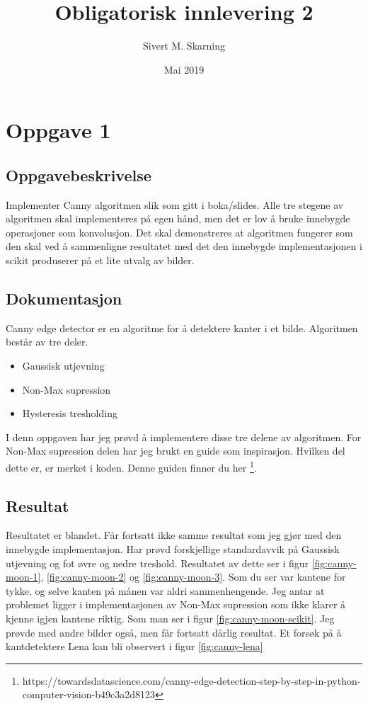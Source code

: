 \documentclass[a4paper, 12pt]{article}
\title{Obligatorisk innlevering 2}
\author{Sivert M. Skarning}
\date{Mai 2019}
\begin{document}
\maketitle

\section{Oppgave 1}
\subsection{Oppgavebeskrivelse}
Implementer Canny algoritmen slik som gitt i boka/slides. Alle tre stegene av algoritmen skal implementeres på egen hånd, men det er lov å bruke innebygde operasjoner som konvolusjon. Det skal demonstreres at algoritmen fungerer som den skal ved å sammenligne resultatet med det den innebygde implementasjonen i scikit produserer på et lite utvalg av bilder.
\subsection{Dokumentasjon}
Canny edge detector er en algoritme for å detektere kanter i et bilde. Algoritmen består av tre deler.
\begin{itemize}
\item Gaussisk utjevning
\item Non-Max supression
\item Hysteresis tresholding
\end{itemize}

I denn oppgaven har jeg prøvd å implementere disse tre delene av algoritmen. For Non-Max supression delen har jeg brukt en guide som inspirasjon. Hvilken del dette er, er merket i koden. Denne guiden finner du her \footnote{https://towardsdatascience.com/canny-edge-detection-step-by-step-in-python-computer-vision-b49c3a2d8123}.
\subsection{Resultat}
Resultatet er blandet. Får fortsatt ikke samme resultat som jeg gjør med den innebygde implementasjon. Har prøvd forskjellige standardavvik på Gaussisk utjevning og fot øvre og nedre treshold. Resultatet av dette ser i figur \ref{fig:canny-moon-1}, \ref{fig:canny-moon-2} og \ref{fig:canny-moon-3}. Som du ser var kantene for tykke, og selve kanten på månen var aldri sammenhengende. Jeg antar at problemet ligger i implementasjonen av Non-Max supression som ikke klarer å kjenne igjen kantene riktig. Som man ser i figur \ref{fig:canny-moon-scikit}. Jeg prøvde med andre bilder også, men får fortsatt dårlig resultat. Et forsøk på å kantdetektere Lena kan bli observert i figur \ref{fig:canny-lena}
\end{document}
